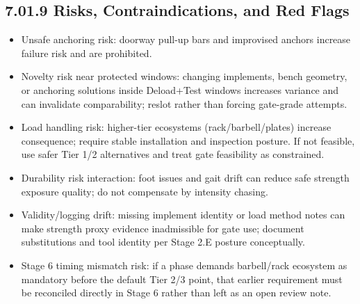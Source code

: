 \documentclass[10pt]{article}
\begin{document}
\subsection*{7.01.9 Risks, Contraindications, and Red Flags}
{}

\begin{itemize}
\item Unsafe anchoring risk: doorway pull-up bars and improvised anchors increase failure risk and are prohibited.
\item Novelty risk near protected windows: changing implements, bench geometry, or anchoring solutions inside Deload+Test windows increases variance and can invalidate comparability; reslot rather than forcing gate-grade attempts.
\item Load handling risk: higher-tier ecosystems (rack/barbell/plates) increase consequence; require stable installation and inspection posture. If not feasible, use safer Tier 1/2 alternatives and treat gate feasibility as constrained.
\item Durability risk interaction: foot issues and gait drift can reduce safe strength exposure quality; do not compensate by intensity chasing.
\item Validity/logging drift: missing implement identity or load method notes can make strength proxy evidence inadmissible for gate use; document substitutions and tool identity per Stage 2.E posture conceptually.
\item Stage 6 timing mismatch risk: if a phase demands barbell/rack ecosystem as mandatory before the default Tier 2/3 point, that earlier requirement must be reconciled directly in Stage 6 rather than left as an open review note.
\end{itemize}
\end{document}
